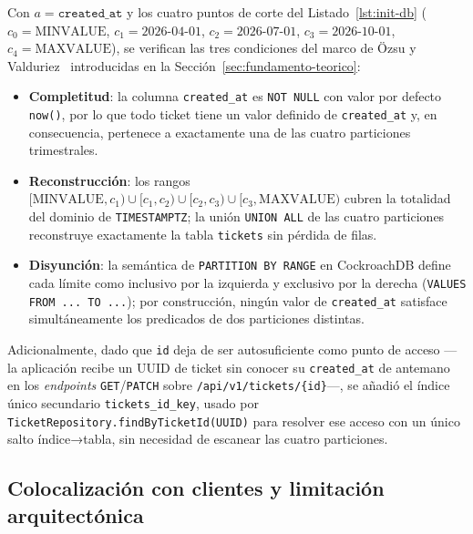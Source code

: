 \documentclass[11pt,letterpaper]{article}
\begin{document}
Con $a = \texttt{created\_at}$ y los cuatro puntos de corte del Listado~\ref{lst:init-db}
($c_0 = \text{MINVALUE}$, $c_1 = \text{2026-04-01}$, $c_2 = \text{2026-07-01}$,
$c_3 = \text{2026-10-01}$, $c_4 = \text{MAXVALUE}$), se verifican las tres condiciones del
marco de Özsu y Valduriez~\cite{ozsu2011principles} introducidas en la
Sección~\ref{sec:fundamento-teorico}:

\begin{itemize}[leftmargin=1.5em]
    \item \textbf{Completitud}: la columna \texttt{created\_at} es \texttt{NOT NULL} con valor
        por defecto \texttt{now()}, por lo que todo ticket tiene un valor definido de
        \texttt{created\_at} y, en consecuencia, pertenece a exactamente una de las cuatro
        particiones trimestrales.
    \item \textbf{Reconstrucción}: los rangos
        $[\text{MINVALUE}, c_1) \cup [c_1, c_2) \cup [c_2, c_3) \cup [c_3, \text{MAXVALUE})$
        cubren la totalidad del dominio de \texttt{TIMESTAMPTZ}; la unión \texttt{UNION ALL} de
        las cuatro particiones reconstruye exactamente la tabla \texttt{tickets} sin pérdida de
        filas.
    \item \textbf{Disyunción}: la semántica de \texttt{PARTITION BY RANGE} en CockroachDB define
        cada límite como inclusivo por la izquierda y exclusivo por la derecha
        (\texttt{VALUES FROM ... TO ...}); por construcción, ningún valor de \texttt{created\_at}
        satisface simultáneamente los predicados de dos particiones distintas.
\end{itemize}

Adicionalmente, dado que \texttt{id} deja de ser autosuficiente como punto de acceso —la
aplicación recibe un UUID de ticket sin conocer su \texttt{created\_at} de antemano en los
\emph{endpoints} \texttt{GET}/\texttt{PATCH} sobre \texttt{/api/v1/tickets/\{id\}}—, se añadió el índice único secundario
\texttt{tickets\_id\_key}, usado por \texttt{TicketRepository.findByTicketId(UUID)} para resolver
ese acceso con un único salto índice→tabla, sin necesidad de escanear las cuatro particiones.

\subsection{Colocalización con clientes y limitación arquitectónica}
\end{document}
